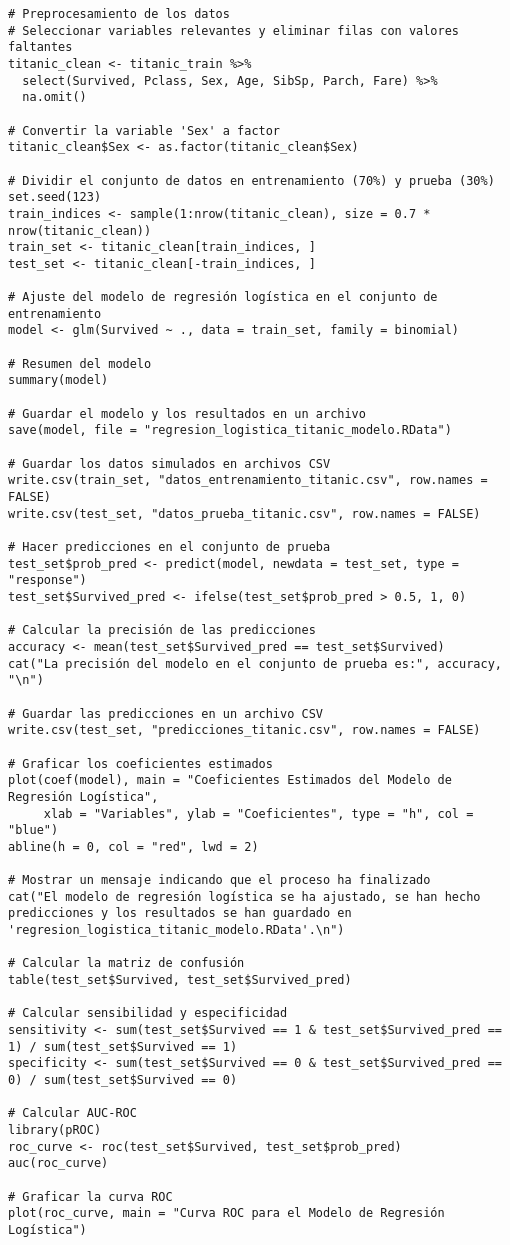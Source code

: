 \begin{verbatim}
# Preprocesamiento de los datos
# Seleccionar variables relevantes y eliminar filas con valores faltantes
titanic_clean <- titanic_train %>%
  select(Survived, Pclass, Sex, Age, SibSp, Parch, Fare) %>%
  na.omit()

# Convertir la variable 'Sex' a factor
titanic_clean$Sex <- as.factor(titanic_clean$Sex)

# Dividir el conjunto de datos en entrenamiento (70%) y prueba (30%)
set.seed(123)
train_indices <- sample(1:nrow(titanic_clean), size = 0.7 * nrow(titanic_clean))
train_set <- titanic_clean[train_indices, ]
test_set <- titanic_clean[-train_indices, ]

# Ajuste del modelo de regresión logística en el conjunto de entrenamiento
model <- glm(Survived ~ ., data = train_set, family = binomial)

# Resumen del modelo
summary(model)

# Guardar el modelo y los resultados en un archivo
save(model, file = "regresion_logistica_titanic_modelo.RData")

# Guardar los datos simulados en archivos CSV
write.csv(train_set, "datos_entrenamiento_titanic.csv", row.names = FALSE)
write.csv(test_set, "datos_prueba_titanic.csv", row.names = FALSE)

# Hacer predicciones en el conjunto de prueba
test_set$prob_pred <- predict(model, newdata = test_set, type = "response")
test_set$Survived_pred <- ifelse(test_set$prob_pred > 0.5, 1, 0)

# Calcular la precisión de las predicciones
accuracy <- mean(test_set$Survived_pred == test_set$Survived)
cat("La precisión del modelo en el conjunto de prueba es:", accuracy, "\n")

# Guardar las predicciones en un archivo CSV
write.csv(test_set, "predicciones_titanic.csv", row.names = FALSE)

# Graficar los coeficientes estimados
plot(coef(model), main = "Coeficientes Estimados del Modelo de Regresión Logística", 
     xlab = "Variables", ylab = "Coeficientes", type = "h", col = "blue")
abline(h = 0, col = "red", lwd = 2)

# Mostrar un mensaje indicando que el proceso ha finalizado
cat("El modelo de regresión logística se ha ajustado, se han hecho predicciones y los resultados se han guardado en 'regresion_logistica_titanic_modelo.RData'.\n")

# Calcular la matriz de confusión
table(test_set$Survived, test_set$Survived_pred)

# Calcular sensibilidad y especificidad
sensitivity <- sum(test_set$Survived == 1 & test_set$Survived_pred == 1) / sum(test_set$Survived == 1)
specificity <- sum(test_set$Survived == 0 & test_set$Survived_pred == 0) / sum(test_set$Survived == 0)

# Calcular AUC-ROC
library(pROC)
roc_curve <- roc(test_set$Survived, test_set$prob_pred)
auc(roc_curve)

# Graficar la curva ROC
plot(roc_curve, main = "Curva ROC para el Modelo de Regresión Logística")


\end{verbatim}

